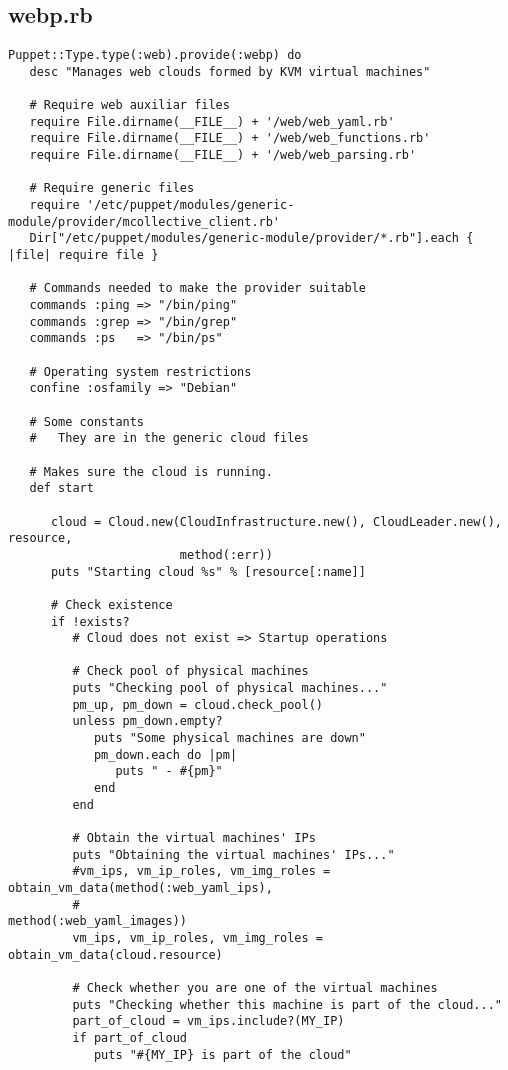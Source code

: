 \subsection{webp.rb}


\begin{lstlisting}
Puppet::Type.type(:web).provide(:webp) do
   desc "Manages web clouds formed by KVM virtual machines"

   # Require web auxiliar files
   require File.dirname(__FILE__) + '/web/web_yaml.rb'
   require File.dirname(__FILE__) + '/web/web_functions.rb'
   require File.dirname(__FILE__) + '/web/web_parsing.rb'
   
   # Require generic files
   require '/etc/puppet/modules/generic-module/provider/mcollective_client.rb'
   Dir["/etc/puppet/modules/generic-module/provider/*.rb"].each { |file| require file }
   
   # Commands needed to make the provider suitable
   commands :ping => "/bin/ping"
   commands :grep => "/bin/grep"
   commands :ps   => "/bin/ps"
   
   # Operating system restrictions
   confine :osfamily => "Debian"

   # Some constants
   #   They are in the generic cloud files

   # Makes sure the cloud is running.
   def start
   
      cloud = Cloud.new(CloudInfrastructure.new(), CloudLeader.new(), resource,
                        method(:err))
      puts "Starting cloud %s" % [resource[:name]]
      
      # Check existence
      if !exists?
         # Cloud does not exist => Startup operations
         
         # Check pool of physical machines
         puts "Checking pool of physical machines..."
         pm_up, pm_down = cloud.check_pool()
         unless pm_down.empty?
            puts "Some physical machines are down"
            pm_down.each do |pm|
               puts " - #{pm}"
            end
         end
         
         # Obtain the virtual machines' IPs
         puts "Obtaining the virtual machines' IPs..."
         #vm_ips, vm_ip_roles, vm_img_roles = obtain_vm_data(method(:web_yaml_ips),
         #                                                   method(:web_yaml_images))
         vm_ips, vm_ip_roles, vm_img_roles = obtain_vm_data(cloud.resource)
         
         # Check whether you are one of the virtual machines
         puts "Checking whether this machine is part of the cloud..."
         part_of_cloud = vm_ips.include?(MY_IP)
         if part_of_cloud
            puts "#{MY_IP} is part of the cloud"
            

\end{lstlisting}
